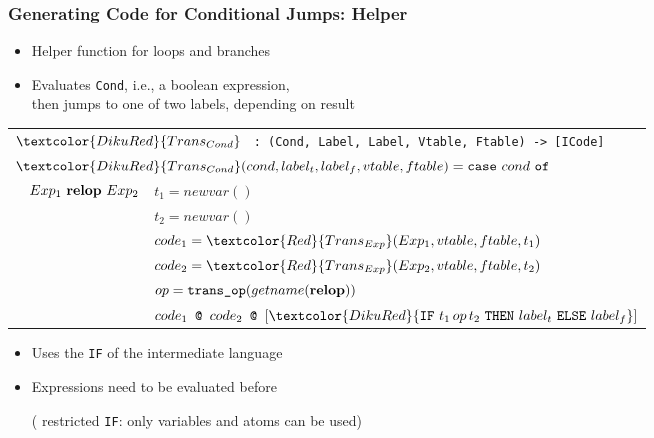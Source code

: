 \documentclass{beamer}
\newcommand{\codesize}{\footnotesize}
\newcommand{\cd}[1]{{{\codesize\tt #1}}}
\newcommand{\red}[1]{\textcolor{Red}{{#1}}}
\renewcommand{\emph}[1]{\textcolor{structure}{#1}}
\newcommand{\emp}[1]{\textcolor{DikuRed}{ #1}}
\begin{document}
\begin{frame}[fragile,t]
	\frametitle{Generating Code for Conditional Jumps: Helper}

\begin{itemize}
\item Helper function for loops and branches

\item \emph{Evaluates} {\tt Cond}, i.e., a boolean expression, \\
	\emph{then jumps} to one of two labels, \emph{depending on result}

\end{itemize}

\bigskip

{\footnotesize
\renewcommand{\arraystretch}{0.9}
\begin{tabular}{lll}%
\multicolumn{3}{l}{
$\emp{Trans_{Cond}}$ \cd{~:~(Cond, Label, Label, Vtable, Ftable) -> [ICode]}} \\
\multicolumn{3}{l}{$\emp{Trans_{Cond}} (cond,label_t,label_f,vtable,ftable) = \mbox{\tt case}~cond~\mbox{\tt of}$} \\\hline

&$Exp_1~{\bf relop}~Exp_2$
         & $t_1 = newvar()$ \\
&        & $t_2 = newvar()$ \\
&        & $code_1 = \red{Trans_{Exp}}(Exp_1,vtable,ftable,t_1)$ \\
&        & $code_2 = \red{Trans_{Exp}}(Exp_2,vtable,ftable,t_2)$ \\
&        & $op = \mbox{\tt trans\_op}(getname({\bf relop}))$ \\
&        & $code_1 \concat code_2 \concat [\emp{{\tt IF}~t_1\,op\,t_2~{\tt THEN}~label_t~{\tt ELSE}~label_f}]$\\[1ex]\hline
\end{tabular}
}

\bigskip

\begin{itemize}
\item Uses the \cd{IF} of the intermediate language
\item Expressions need to be evaluated before 

	(\emp{restricted \cd{IF}: only variables and atoms can be used})
\end{itemize}
\end{frame}
\end{document}
